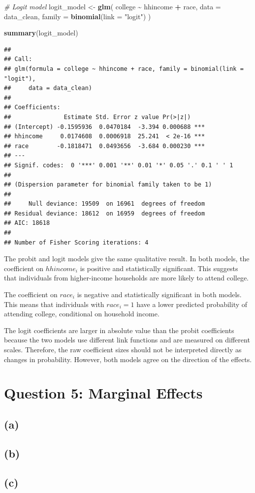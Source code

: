 \documentclass[
]{article}
\newenvironment{Shaded}{\begin{snugshade}}{\end{snugshade}}
\newcommand{\AttributeTok}[1]{\textcolor[rgb]{0.13,0.29,0.53}{#1}}
\newcommand{\CommentTok}[1]{\textcolor[rgb]{0.56,0.35,0.01}{\textit{#1}}}
\newcommand{\FunctionTok}[1]{\textcolor[rgb]{0.13,0.29,0.53}{\textbf{#1}}}
\newcommand{\NormalTok}[1]{#1}
\newcommand{\OtherTok}[1]{\textcolor[rgb]{0.56,0.35,0.01}{#1}}
\newcommand{\SpecialCharTok}[1]{\textcolor[rgb]{0.81,0.36,0.00}{\textbf{#1}}}
\newcommand{\StringTok}[1]{\textcolor[rgb]{0.31,0.60,0.02}{#1}}
\begin{document}
\begin{Shaded}
\begin{Highlighting}[]
\CommentTok{\# Logit model}
\NormalTok{logit\_model }\OtherTok{\textless{}{-}} \FunctionTok{glm}\NormalTok{(}
\NormalTok{  college }\SpecialCharTok{\textasciitilde{}}\NormalTok{ hhincome }\SpecialCharTok{+}\NormalTok{ race,}
  \AttributeTok{data =}\NormalTok{ data\_clean,}
  \AttributeTok{family =} \FunctionTok{binomial}\NormalTok{(}\AttributeTok{link =} \StringTok{"logit"}\NormalTok{)}
\NormalTok{)}

\FunctionTok{summary}\NormalTok{(logit\_model)}
\end{Highlighting}
\end{Shaded}

\begin{verbatim}
## 
## Call:
## glm(formula = college ~ hhincome + race, family = binomial(link = "logit"), 
##     data = data_clean)
## 
## Coefficients:
##               Estimate Std. Error z value Pr(>|z|)    
## (Intercept) -0.1595936  0.0470184  -3.394 0.000688 ***
## hhincome     0.0174608  0.0006918  25.241  < 2e-16 ***
## race        -0.1818471  0.0493656  -3.684 0.000230 ***
## ---
## Signif. codes:  0 '***' 0.001 '**' 0.01 '*' 0.05 '.' 0.1 ' ' 1
## 
## (Dispersion parameter for binomial family taken to be 1)
## 
##     Null deviance: 19509  on 16961  degrees of freedom
## Residual deviance: 18612  on 16959  degrees of freedom
## AIC: 18618
## 
## Number of Fisher Scoring iterations: 4
\end{verbatim}

The probit and logit models give the same qualitative result. In both
models, the coefficient on \(hhincome_i\) is positive and statistically
significant. This suggests that individuals from higher-income
households are more likely to attend college.

The coefficient on \(race_i\) is negative and statistically significant
in both models. This means that individuals with \(race_i = 1\) have a
lower predicted probability of attending college, conditional on
household income.

The logit coefficients are larger in absolute value than the probit
coefficients because the two models use different link functions and are
measured on different scales. Therefore, the raw coefficient sizes
should not be interpreted directly as changes in probability. However,
both models agree on the direction of the effects.

\section{Question 5: Marginal
Effects}\label{question-5-marginal-effects}

\subsection{(a)}\label{a-3}

\subsection{(b)}\label{b-3}

\subsection{(c)}\label{c-2}
\end{document}
